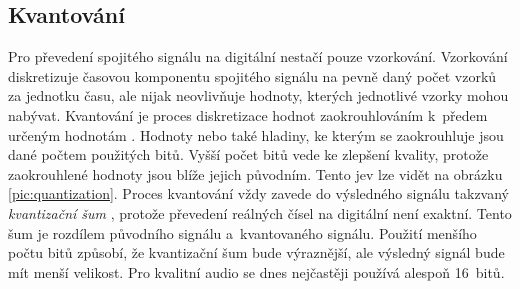 \subsection*{Kvantování}
\label{sub:quantization}

Pro převedení spojitého signálu na digitální nestačí pouze vzorkování.
Vzorkování diskretizuje časovou komponentu spojitého signálu na pevně daný
počet vzorků za jednotku času, ale nijak neovlivňuje hodnoty, kterých
jednotlivé vzorky mohou nabývat. Kvantování je proces diskretizace hodnot
zaokrouhlováním k~předem určeným hodnotám \cite{Oliver1948}. Hodnoty nebo také
hladiny, ke kterým se zaokrouhluje jsou dané počtem použitých bitů. Vyšší počet
bitů vede ke zlepšení kvality, protože zaokrouhlené hodnoty jsou blíže jejich
původním. Tento jev lze vidět na obrázku \ref{pic:quantization}. Proces
kvantování vždy zavede do výsledného signálu takzvaný \textit{kvantizační šum}
\cite{Oliver1948}, protože převedení reálných čísel na digitální není exaktní.
Tento šum je rozdílem původního signálu a~kvantovaného signálu. Použití menšího
počtu bitů způsobí, že kvantizační šum bude výraznější, ale výsledný signál bude
mít menší velikost. Pro kvalitní audio se dnes nejčastěji používá alespoň
16~bitů.

